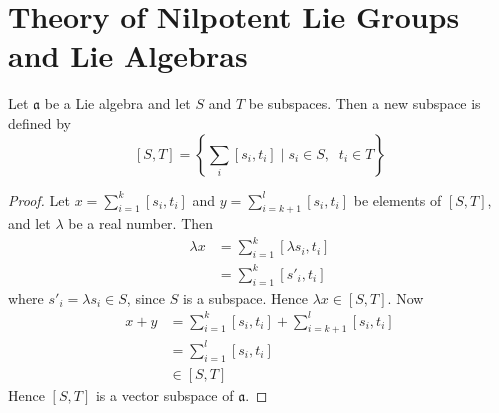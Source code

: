 \documentclass[honours]{UNSWthesis}
\newcommand{\1}{\mathbf{e}_{1}}
\newcommand{\2}{\mathbf{e}_{3}}
\newcommand{\3}{\mathbf{e}_{3}}
\begin{document}
\section{Theory of Nilpotent Lie Groups and Lie Algebras}



Let $\mathfrak{a}$ be a Lie algebra and let $S$ and $T$ be subspaces. Then a new subspace is defined by 
\[
[S,T]=\left\lbrace \sum\limits_{i} [s_{i},t_{i}] \mid s_{i} \in S,\;\; t_{i} \in T \right\rbrace
\]

\begin{proof}
Let $x=\sum\limits_{i=1}^{k} [s_{i},t_{i}]$ and $y=\sum\limits_{i=k+1}^{l} [s_{i},t_{i}]$ be elements of $[S,T]$, and let $\lambda$ be a real number. Then
\begin{align*}
\lambda x &=\sum\limits_{i=1}^{k} [\lambda s_{i},t_{i}]\\
&=\sum\limits_{i=1}^{k} [s'_{i},t_{i}]
\end{align*}
where $s'_{i}=\lambda s_{i} \in S$, since $S$ is a subspace. Hence $\lambda x \in [S,T]$.
\newline Now
\begin{align*}
x+y&=\sum\limits_{i=1}^{k} [s_{i},t_{i}]+\sum\limits_{i=k+1}^{l} [s_{i},t_{i}]\\
&= \sum\limits_{i=1}^{l} [s_{i},t_{i}] \\
&\in [S,T]
\end{align*}
Hence $[S,T]$ is a vector subspace of $\mathfrak{a}$.
\newline


\end{proof}
\end{document}
